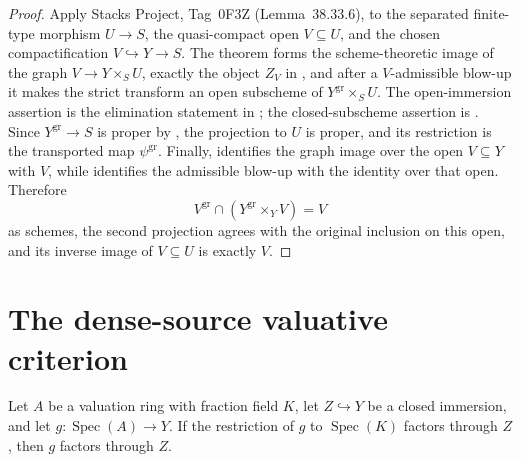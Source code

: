 \begin{proof}
  Apply Stacks Project, Tag~0F3Z (Lemma~38.33.6), to the separated
  finite-type morphism $U\to S$, the quasi-compact open $V\subseteq U$, and
  the chosen compactification $V\hookrightarrow Y\to S$.  The theorem forms
  the scheme-theoretic image of the graph
  $V\to Y\times_SU$, exactly the object $Z_V$ in
  , and after a $V$-admissible blow-up it
  makes the strict transform an open subscheme of
  $Y^{\mathrm{gr}}\times_SU$.  The open-immersion assertion is the
  elimination statement in
  ; the closed-subscheme
  assertion is
  .  Since
  $Y^{\mathrm{gr}}\to S$ is proper by
  , the projection to $U$ is proper,
  and its restriction is the transported map $\psi^{\mathrm{gr}}$.
  Finally,
   identifies the graph
  image over the open $V\subseteq Y$ with $V$, while
   identifies the
  admissible blow-up with the identity over that open.  Therefore
  \[
    V^{\mathrm{gr}}\cap
    (Y^{\mathrm{gr}}\times_YV)=V
  \]
  as schemes, the second projection agrees with the original inclusion on
  this open, and its inverse image of $V\subseteq U$ is exactly $V$.
\end{proof}


\section{The dense-source valuative criterion}

\begin{lemma}
  \label{lemma:nagata-valuation-factor-closed}

  Let $A$ be a valuation ring with fraction field $K$, let $Z\hookrightarrow Y$
  be a closed immersion, and let $g\colon\operatorname{Spec}(A)\to Y$.  If the
  restriction of $g$ to $\operatorname{Spec}(K)$ factors through $Z$, then
  $g$ factors through $Z$.
\end{lemma}

